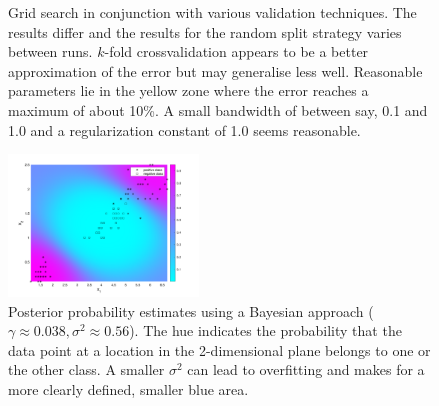 \begin{figure}[htp]
\centering
{}\hfil
{}\hfil
{}\hfil
\caption{Grid search in conjunction with various validation techniques. The results differ and the results for the random split strategy varies between runs. $k$-fold crossvalidation appears to be a better approximation of the error but may generalise less well. Reasonable parameters lie in the yellow zone where the error reaches a maximum of about 10\%. A small bandwidth of between say, 0.1 and 1.0 and a regularization constant of 1.0 seems reasonable.}
\label{validation}
\end{figure}

\begingroup
\setlength{\columnsep}{0.75cm}
\setlength{\intextsep}{0.2cm}
\begin{figure}
	\centering
       	 \includegraphics[width=0.45\textwidth]{../src/figures/iris/bayesian/bayesian_probabilities}
        	\caption{Posterior probability estimates using a Bayesian approach ($\gamma\approx0.038,\sigma^2\approx 0.56$). The hue indicates the probability that the data point at a location in the 2-dimensional plane belongs to one or the other class. A smaller $\sigma^2$ can lead to overfitting and makes for a more clearly defined, smaller blue area.}
	\label{irisbayesian}
\end{figure}

